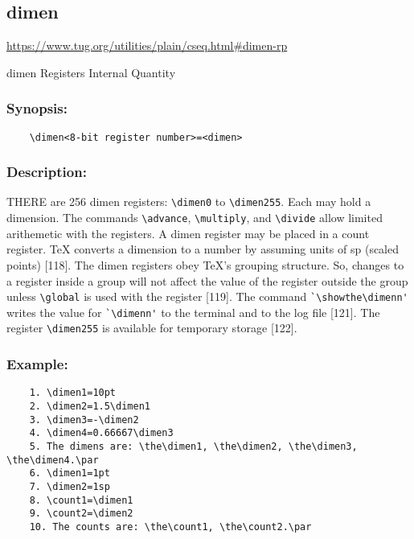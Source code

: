  
 

\subsection{dimen}
\url{https://www.tug.org/utilities/plain/cseq.html#dimen-rp}

dimen 	Registers
Internal Quantity

\subsubsection{Synopsis:}

\begin{verbatim}
	\dimen<8-bit register number>=<dimen>
\end{verbatim}

\subsubsection{Description:}

THERE are 256 dimen registers: \verb|\dimen0| to \verb|\dimen255|. Each may hold a
dimension. The commands \verb|\advance|, \verb|\multiply|, and \verb|\divide| allow limited
arithemetic with the registers. A dimen register may be placed in a count
register. TeX converts a dimension to a number by assuming units of sp
(scaled points) [118]. The dimen registers obey TeX's grouping structure.
So, changes to a register inside a group will not affect the value of the
register outside the group unless \verb|\global| is used with the register [119].
The command \verb|`\showthe\dimenn'| writes the value for \verb|`\dimenn'| to the
terminal and to the log file [121]. The register \verb|\dimen255| is available for
temporary storage [122].

\subsubsection{Example:}

\begin{verbatim}
	1. \dimen1=10pt
	2. \dimen2=1.5\dimen1
	3. \dimen3=-\dimen2
	4. \dimen4=0.66667\dimen3
	5. The dimens are: \the\dimen1, \the\dimen2, \the\dimen3, \the\dimen4.\par
	6. \dimen1=1pt
	7. \dimen2=1sp
	8. \count1=\dimen1
	9. \count2=\dimen2
	10. The counts are: \the\count1, \the\count2.\par
\end{verbatim}

